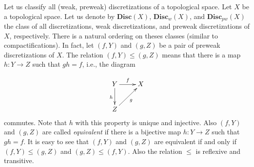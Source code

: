 \documentclass[manuscript]{amsart}
\theoremstyle{definition}
\begin{document}
Let us classify all (weak, preweak) discretizations of a topological space.
Let $X$ be a topological space.
Let us denote by $\mathbf{Disc}(X)$, $\mathbf{Disc}_{w}(X)$, and $\mathbf{Disc}_{pw}(X)$
the class of all discretizations,
weak  discretizations, and preweak discretizations of $X$, respectively.
 There is a natural ordering on theses classes (similar to compactifications).
 In fact, let $(f,Y)$ and $(g,Z)$ be a pair of preweak discretizations
 of $X$. The relation $(f,Y)\leq (g,Z)$  means that there is  a map
 $h:Y\to Z$ such that $gh=f$, i.e., the  diagram

 \[
\xymatrix{
Y \ar[r]^{f} \ar[d]_{h} & X\\
 Z \ar[ur]_{g}&
}
\]
commutes. Note that  $h$ with this property is unique and injective. Also
$(f,Y)$ and $(g,Z)$ are called \emph{equivalent} if
there is a bijective map $h:Y\to Z$ such that $gh=f$.
It is easy to see that $(f,Y)$ and $(g,Z)$ are equivalent if and only
if $(f,Y)\leq (g,Z)$ and $(g,Z) \leq (f,Y)$. Also
the relation $\leq $ is reflexive and transitive.
\end{document}
